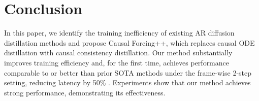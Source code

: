 \section{Conclusion}

In this paper, we identify the training inefficiency of existing AR diffusion distillation methods and propose Causal Forcing++, which replaces causal ODE distillation with causal consistency distillation. Our method substantially improves training efficiency and, for the first time, achieves performance comparable to or better than prior SOTA methods under the frame-wise 2-step setting, reducing latency by 50\% . Experiments show that our method achieves strong performance, demonstrating its effectiveness.

